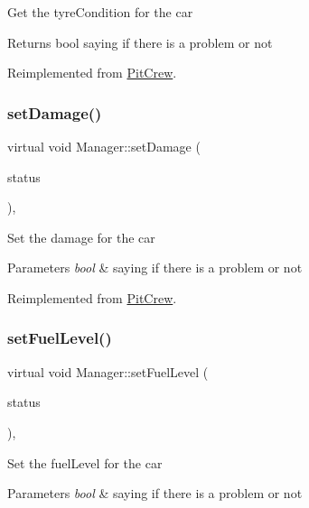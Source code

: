 Get the tyre\+Condition for the car \begin{DoxyReturn}{Returns}
bool saying if there is a problem or not 
\end{DoxyReturn}


Reimplemented from \mbox{\hyperlink{class_pit_crew_a7a527a6b4eccb6570dcad04b04dc1177}{Pit\+Crew}}.

\mbox{\label{class_manager_abb374f168cde17c59609660efff6b186}} 
\subsubsection{\texorpdfstring{set\+Damage()}{setDamage()}}
{\footnotesize\ttfamily virtual void Manager\+::set\+Damage (\begin{DoxyParamCaption}\item[{bool}]{status }\end{DoxyParamCaption})\hspace{0.3cm}{\ttfamily [inline]}, {\ttfamily [virtual]}}

Set the damage for the car 
\begin{DoxyParams}{Parameters}
{\em bool} & saying if there is a problem or not \\
\hline
\end{DoxyParams}


Reimplemented from \mbox{\hyperlink{class_pit_crew_a41051dd7081efeac022cc3a35a592c64}{Pit\+Crew}}.

\mbox{\label{class_manager_a14c804ff23b09be331842d3db9cbbbe1}} 
\subsubsection{\texorpdfstring{set\+Fuel\+Level()}{setFuelLevel()}}
{\footnotesize\ttfamily virtual void Manager\+::set\+Fuel\+Level (\begin{DoxyParamCaption}\item[{bool}]{status }\end{DoxyParamCaption})\hspace{0.3cm}{\ttfamily [inline]}, {\ttfamily [virtual]}}

Set the fuel\+Level for the car 
\begin{DoxyParams}{Parameters}
{\em bool} & saying if there is a problem or not \\
\hline
\end{DoxyParams}


